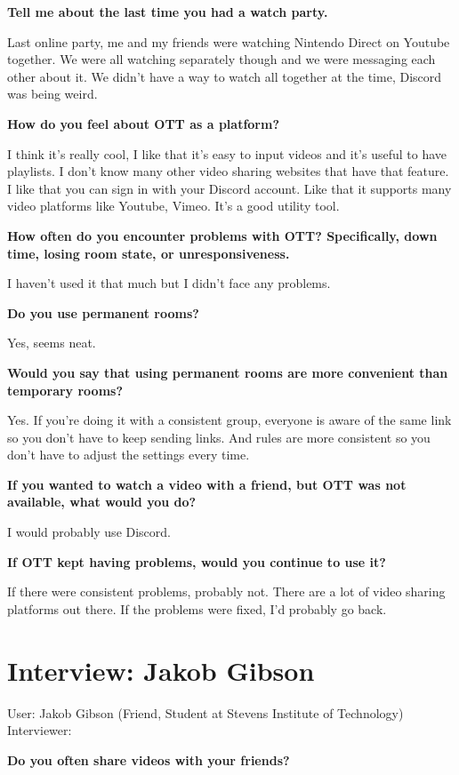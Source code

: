 \textbf{Tell me about the last time you had a watch party.}

Last online party, me and my friends were watching Nintendo Direct on Youtube together. We were all watching separately though and we were messaging each other about it. We didn't have a way to watch all together at the time, Discord was being weird.

\textbf{How do you feel about OTT as a platform?}

I think it's really cool, I like that it's easy to input videos and it's useful to have playlists. I don't know many other video sharing websites that have that feature. I like that you can sign in with your Discord account. Like that it supports many video platforms like Youtube, Vimeo. It's a good utility tool.

\textbf{How often do you encounter problems with OTT? Specifically, down time, losing room state, or unresponsiveness.}

I haven't used it that much but I didn't face any problems.

\textbf{Do you use permanent rooms?}

Yes, seems neat.

\textbf{Would you say that using permanent rooms are more convenient than temporary rooms?}

Yes. If you're doing it with a consistent group, everyone is aware of the same link so you don't have to keep sending links. And rules are more consistent so you don't have to adjust the settings every time.

\textbf{If you wanted to watch a video with a friend, but OTT was not available, what would you do?}

I would probably use Discord.

\textbf{If OTT kept having problems, would you continue to use it?}

If there were consistent problems, probably not. There are a lot of video sharing platforms out there. If the problems were fixed, I'd probably go back.


\section{Interview: Jakob Gibson}

User: Jakob Gibson (Friend, Student at Stevens Institute of Technology) \\
Interviewer:

\textbf{Do you often share videos with your friends?}


